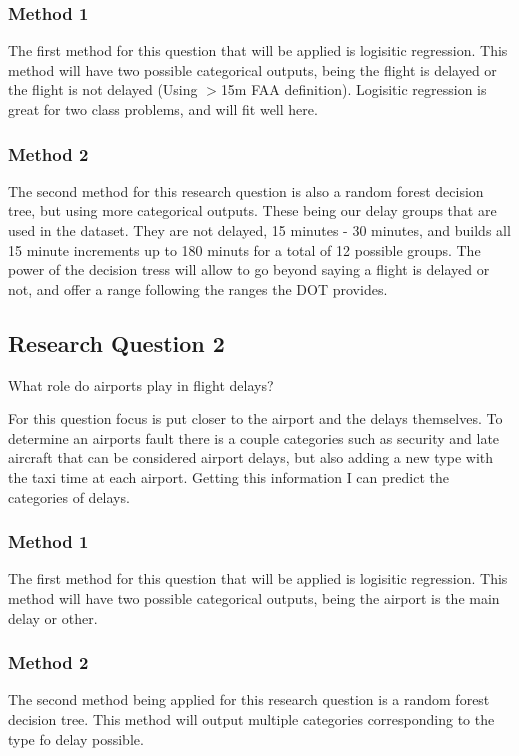 \documentclass[a4paper,12pt]{article}
\begin{document}
\subsubsection{Method 1}

The first method for this question that will be applied is logisitic regression. This method will have two possible categorical outputs, being the flight is delayed
or the flight is not delayed (Using $>$15m FAA definition). Logisitic regression is great for two class problems, and will fit well here.

\subsubsection{Method 2}
The second method for this research question is also a random forest decision tree, but using more categorical outputs. These being our delay groups that are used in the dataset. They are not delayed, 15 minutes - 30 minutes, and builds all 15 minute increments
up to 180 minuts for a total of 12 possible groups. The power of the decision tress will allow to go beyond saying a flight is delayed or not, and offer a range following
the ranges the DOT provides.

\subsection{Research Question 2}
What role do airports play in flight delays?

For this question focus is put closer to the airport and the delays themselves. To determine an airports fault there is a couple categories such as security and late aircraft that can be considered airport delays,
but also adding a new type with the taxi time at each airport. Getting this information I can predict the categories of delays.

\subsubsection{Method 1}
The first method for this question that will be applied is logisitic regression. This method will have two possible categorical outputs, being the airport is the main delay
or other.

\subsubsection{Method 2}
The second method being applied for this research question is a random forest decision tree. This method will output multiple categories corresponding to the type fo delay possible.
\end{document}
